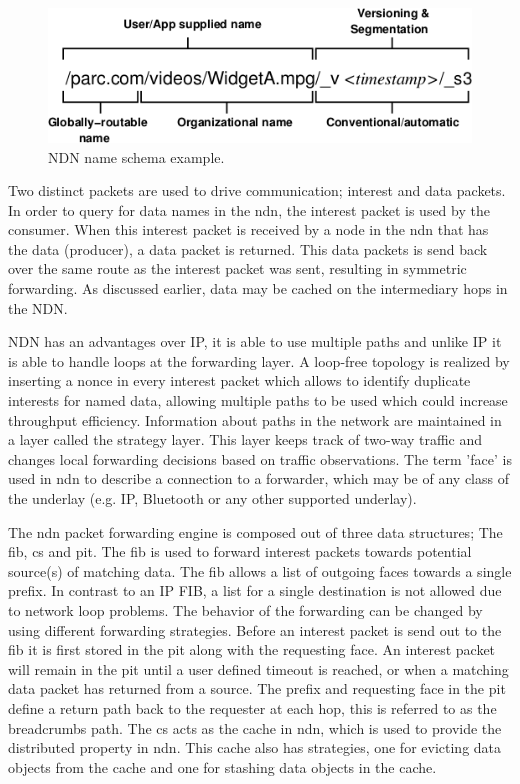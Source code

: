 \begin{figure}[H]
\centering
\includegraphics[width=\columnwidth/2]{Images/ndn_name.png}
\caption{NDN name schema example.}
\label{fig:ndn_name}
\end{figure}

Two distinct packets are used to drive communication; interest and data packets. In order to query for data names in the \gls{ndn}, the interest packet is used by the consumer. When this interest packet is received by a node in the \gls{ndn} that has the data (producer), a data packet is returned. This data packets is send back over the same route as the interest packet was sent, resulting in symmetric forwarding. As discussed earlier, data may be cached on the intermediary hops in the NDN.

NDN has an advantages over IP, it is able to use multiple paths and unlike IP it is able to handle loops at the forwarding layer. A loop-free topology is realized by inserting a nonce in every interest packet which allows to identify duplicate interests for named data, allowing multiple paths to be used which could increase throughput efficiency. Information about paths in the network are maintained in a layer called the strategy layer. This layer keeps track of two-way traffic and changes local forwarding decisions based on traffic observations. The term 'face' is used in \gls{ndn} to describe a connection to a forwarder, which may be of any class of the underlay (e.g. IP, Bluetooth or any other supported underlay).

The \gls{ndn} packet forwarding engine is composed out of three data structures; The \gls{fib}, \gls{cs} and \gls{pit}. The \gls{fib} is used to forward interest packets towards potential source(s) of matching data. The \gls{fib} allows a list of outgoing faces towards a single prefix. In contrast to an IP FIB, a list for a single destination is not allowed due to network loop problems. The behavior of the forwarding can be changed by using different forwarding strategies. Before an interest packet is send out to the \gls{fib} it is first stored in the \gls{pit} along with the requesting face. An interest packet will remain in the \gls{pit} until a user defined timeout is reached, or when a matching data packet has returned from a source. The prefix and requesting face in the \gls{pit} define a return path back to the requester at each hop, this is referred to as the breadcrumbs path. The \gls{cs} acts as the cache in \gls{ndn}, which is used to provide the distributed property in \gls{ndn}. This cache also has strategies, one for evicting data objects from the cache and one for stashing data objects in the cache.

